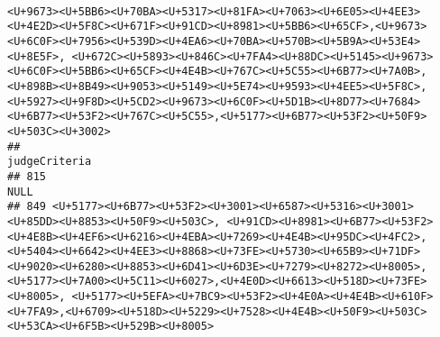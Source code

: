 \documentclass[
]{article}
\begin{document}
\begin{verbatim}
                                                                                                                                                                                                                                                                                                                                                                                                                                                                                                                                                                                                                                                                                                                                                                                                                                                                                                                        <U+9673><U+5BB6><U+70BA><U+5317><U+81FA><U+7063><U+6E05><U+4EE3><U+4E2D><U+5F8C><U+671F><U+91CD><U+8981><U+5BB6><U+65CF>,<U+9673><U+6C0F><U+7956><U+539D><U+4EA6><U+70BA><U+570B><U+5B9A><U+53E4><U+8E5F>, <U+672C><U+5893><U+846C><U+7FA4><U+88DC><U+5145><U+9673><U+6C0F><U+5BB6><U+65CF><U+4E4B><U+767C><U+5C55><U+6B77><U+7A0B>,<U+898B><U+8B49><U+9053><U+5149><U+5E74><U+9593><U+4EE5><U+5F8C>,<U+5927><U+9F8D><U+5CD2><U+9673><U+6C0F><U+5D1B><U+8D77><U+7684><U+6B77><U+53F2><U+767C><U+5C55>,<U+5177><U+6B77><U+53F2><U+50F9><U+503C><U+3002>
##                                                                                                                                                                                                                                                                                                                                                                                                                                                                                                                                                          judgeCriteria
## 815                                                                                                                                                                                                                                                                                                                                                                                                                                                                                                                                                               NULL
## 849 <U+5177><U+6B77><U+53F2><U+3001><U+6587><U+5316><U+3001><U+85DD><U+8853><U+50F9><U+503C>, <U+91CD><U+8981><U+6B77><U+53F2><U+4E8B><U+4EF6><U+6216><U+4EBA><U+7269><U+4E4B><U+95DC><U+4FC2>, <U+5404><U+6642><U+4EE3><U+8868><U+73FE><U+5730><U+65B9><U+71DF><U+9020><U+6280><U+8853><U+6D41><U+6D3E><U+7279><U+8272><U+8005>, <U+5177><U+7A00><U+5C11><U+6027>,<U+4E0D><U+6613><U+518D><U+73FE><U+8005>, <U+5177><U+5EFA><U+7BC9><U+53F2><U+4E0A><U+4E4B><U+610F><U+7FA9>,<U+6709><U+518D><U+5229><U+7528><U+4E4B><U+50F9><U+503C><U+53CA><U+6F5B><U+529B><U+8005>

\end{verbatim}
\end{document}
